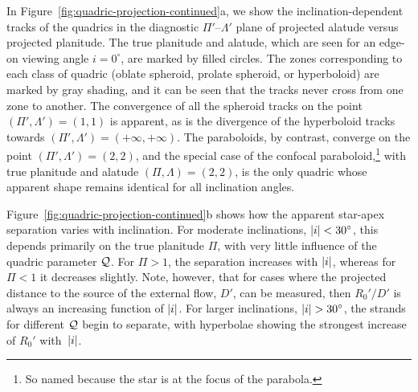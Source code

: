In Figure~\ref{fig:quadric-projection-continued}a, we show the
inclination-dependent tracks of the quadrics in the diagnostic
\(\Pi'\)--\(\Lambda'\) plane of projected alatude versus projected planitude.
The true planitude and alatude, which are seen for an edge-on viewing
angle \(i = 0^\circ\), are marked by filled circles.  The zones
corresponding to each class of quadric (oblate spheroid, prolate
spheroid, or hyperboloid) are marked by gray shading, and it can be
seen that the tracks never cross from one zone to another. The
convergence of all the spheroid tracks on the point
\((\Pi', \Lambda') = (1, 1)\) is apparent, as is the divergence of the
hyperboloid tracks towards \((\Pi', \Lambda') = (+\infty, +\infty)\).  The paraboloids,
by contrast, converge on the point \((\Pi', \Lambda') = (2, 2)\), and the
special case of the confocal paraboloid,\footnote{So named because the
  star is at the focus of the parabola.} with true planitude and
alatude \((\Pi, \Lambda) = (2, 2)\), is the only quadric whose apparent shape
remains identical for all inclination angles.  

Figure~\ref{fig:quadric-projection-continued}b shows how the apparent
star-apex separation varies with inclination.  For moderate
inclinations, \(\lvert i\rvert < 30^\circ\), this depends primarily on the true
planitude \(\Pi\), with very little influence of the quadric parameter
\(\mathcal{Q}\).  For \(\Pi > 1\), the separation increases with \(\lvert i\rvert\), whereas
for \(\Pi < 1\) it decreases slightly.  Note, however, that for cases
where the projected distance to the source of the external flow,
\(D'\), can be measured, then \(R_0'/D'\) is always an increasing
function of \(\lvert i\rvert\).  For larger inclinations, \(\lvert i\rvert > 30^\circ\), the
strands for different \(\mathcal{Q}\) begin to separate, with hyperbolae
showing the strongest increase of \(R_0'\) with~\(\lvert i\rvert\).

